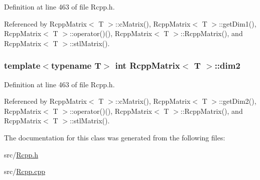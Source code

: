 Definition at line 463 of file Rcpp.h.

Referenced by RcppMatrix$<$ T $>$::cMatrix(), RcppMatrix$<$ T $>$::getDim1(), RcppMatrix$<$ T $>$::operator()(), RcppMatrix$<$ T $>$::RcppMatrix(), and RcppMatrix$<$ T $>$::stlMatrix().\hypertarget{classRcppMatrix_d01bc64d89dcc475f7c90f1580bf5d52}{
\subsubsection[{dim2}]{\setlength{\rightskip}{0pt plus 5cm}template$<$typename T$>$ int {\bf RcppMatrix}$<$ T $>$::{\bf dim2}}}
\label{classRcppMatrix_d01bc64d89dcc475f7c90f1580bf5d52}




Definition at line 463 of file Rcpp.h.

Referenced by RcppMatrix$<$ T $>$::cMatrix(), RcppMatrix$<$ T $>$::getDim2(), RcppMatrix$<$ T $>$::operator()(), RcppMatrix$<$ T $>$::RcppMatrix(), and RcppMatrix$<$ T $>$::stlMatrix().

The documentation for this class was generated from the following files:\begin{CompactItemize}
\item 
src/\hyperlink{Rcpp_8h}{Rcpp.h}\item 
src/\hyperlink{Rcpp_8cpp}{Rcpp.cpp}\end{CompactItemize}
